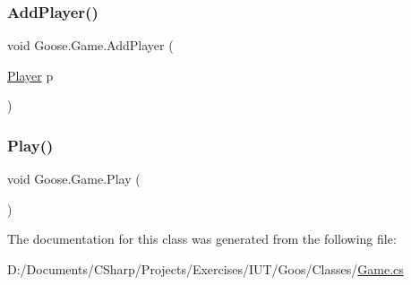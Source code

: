 \subsubsection{\texorpdfstring{Add\+Player()}{AddPlayer()}}
{\footnotesize\ttfamily void Goose.\+Game.\+Add\+Player (\begin{DoxyParamCaption}\item[{\hyperlink{class_goose_1_1_player}{Player}}]{p }\end{DoxyParamCaption})}

\mbox{\label{class_goose_1_1_game_aa957321a949b4dc204cf16365370a7f5}} 
\subsubsection{\texorpdfstring{Play()}{Play()}}
{\footnotesize\ttfamily void Goose.\+Game.\+Play (\begin{DoxyParamCaption}{ }\end{DoxyParamCaption})}



The documentation for this class was generated from the following file\+:\begin{DoxyCompactItemize}
\item 
D\+:/\+Documents/\+C\+Sharp/\+Projects/\+Exercises/\+I\+U\+T/\+Goos/\+Classes/\hyperlink{_game_8cs}{Game.\+cs}\end{DoxyCompactItemize}

